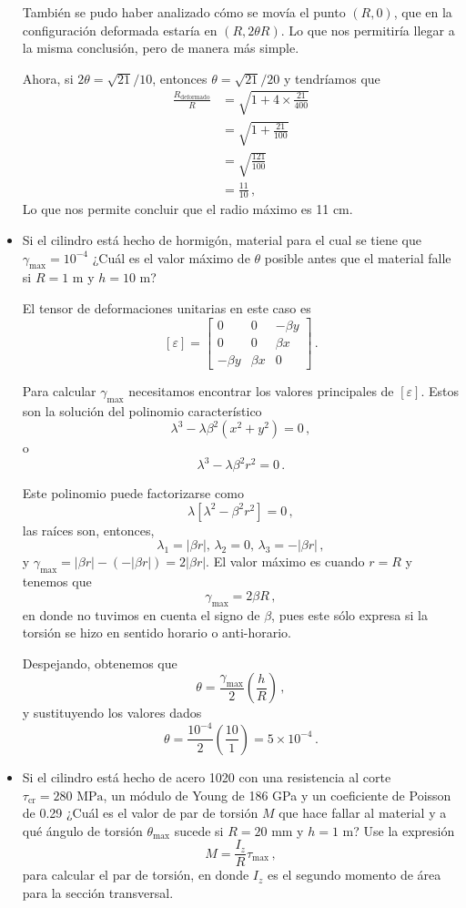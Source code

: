 \documentclass[../notas medios.tex]{subfiles}
\begin{document}
\begin{itemize}
También se pudo haber analizado cómo se movía el punto $(R, 0)$, que en la configuración deformada estaría en $(R, 2\theta R)$. Lo que nos permitiría llegar a la misma conclusión, pero de manera más simple.

Ahora, si $2\theta =\sqrt{21}/10$, entonces $\theta = \sqrt{21}/20$ y tendríamos que
\begin{align*}
  \frac{R_\text{deformado}}{R} &= \sqrt{1 + 4\times \frac{21}{400}} \\
    &= \sqrt{1 + \frac{21}{100}} \\
    &= \sqrt{\frac{121}{100}} \\
    &= \frac{11}{10}\, ,
\end{align*}
Lo que nos permite concluir que el radio máximo es 11 cm.

\item
Si el cilindro está hecho de hormigón, material para el cual se tiene que $\gamma_{\max} = 10^{-4}$ ¿Cuál es el valor máximo de $\theta$ posible antes que el material falle si $R = 1$ m y $h=10$ m?

El tensor de deformaciones unitarias en este caso es
\[[\varepsilon] =\begin{bmatrix}
	0 &0 &-\beta y\\
	0 &0 &\beta x\\
	-\beta y &\beta x &0
    \end{bmatrix}\, .
   \]
   
Para calcular $\gamma_{\max}$ necesitamos encontrar los valores principales de $[\varepsilon]$. Estos son la solución del polinomio característico
\[\lambda^3 - \lambda \beta^2(x^2 + y^2) = 0\, ,\]
o
\[\lambda^3 - \lambda \beta^2 r^2 = 0\, .\]

Este polinomio puede factorizarse como
\[\lambda[\lambda^2 - \beta^2 r^2] = 0\, ,\]
las raíces son, entonces,
\[\lambda_1 = |\beta r|,\, \lambda_2 = 0,\, \lambda_3 = -|\beta r|\, ,\]
y $\gamma_{\max} = |\beta r| - (-|\beta r|) = 2|\beta r|$. El valor máximo es cuando $r=R$ y tenemos que
\[\gamma_{\max} = 2\beta R\, ,\]
en donde no tuvimos en cuenta el signo de $\beta$, pues este sólo expresa si la torsión se hizo en sentido horario o anti-horario.

Despejando, obtenemos que
\[\theta = \frac{\gamma_{\max}}{2} \left(\frac{h}{R}\right)\, ,\]
y sustituyendo los valores dados
\[\theta = \frac{10^{-4}}{2} \left(\frac{10}{1} \right) = 5\times 10^{-4} \, .\]

\item
Si el cilindro está hecho de acero 1020 con una resistencia al corte \(\tau_\text{cr} = 280 \text{ MPa}\), un módulo de Young de 186 GPa y un coeficiente de Poisson de 0.29
¿Cuál es el valor de par de torsión \(M\) que hace fallar al material y a qué ángulo de torsión \(\theta_{\max}\) sucede si $R = 20$ mm y $h=1$ m? Use la expresión
\[M = \frac{I_z}{R} \tau_{\max}\, ,\]
para calcular el par de torsión, en donde \(I_z\) es el segundo momento de área para la sección transversal.


\end{itemize}
\end{document}
